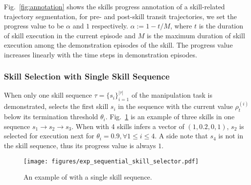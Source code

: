 Fig.~\ref{fig:annotation} shows the skills progress annotation of a skill-related trajectory segmentation, for pre- and post-skill transit trajectories, we set the progress value to be $\alpha$ and $1$ respectively. $\alpha:=1-t/M$, where $t$ is the duration of skill execution in the current episode and $M$ is the maximum duration of skill execution among the demonstration episodes of the skill.
The progress value increases linearly with the time steps in demonstration episodes. %




\subsubsection{Skill Selection with Single Skill Sequence}
\label{sec:sequential_progss}
When only one skill sequence $\tau=\{s_i\}_{i=1}^{|\tau|}$ of the manipulation task is demonstrated, \progss selects the first skill $s_i$ in the sequence with the current value $\rho^{(i)}_t $ below its termination threshold $\theta_i$. 
Fig.~\ref{fig:exp-skill-selector} is an example of three skills in one sequence $s_1\rightarrow s_2\rightarrow s_3$. 
When \progss with 4 skills infers a vector of $(1, 0.2, 0, 1)$, $s_2$ is selected for execution next for $\theta_i = 0.9, \forall 1\leq i \leq 4$. A side note that $s_4$ is not in the skill sequence, thus its progress value is always $1$.
\vspace{-1mm}
\begin{figure}[H]
    \centering
    \texttt{[image: figures/exp\_sequential\_skill\_selector.pdf]}
    \vspace{-7mm}
    \caption{An example of \progss with a single skill sequence.}
    \label{fig:exp-skill-selector}
\end{figure}
% 

